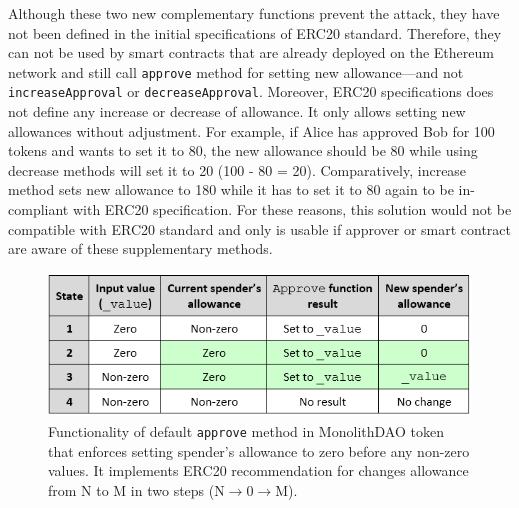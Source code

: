 \noindent Although these two new complementary functions prevent the attack, they have not been defined in the initial specifications of ERC20 standard. Therefore, they can not be used by smart contracts that are already deployed on the Ethereum network and still call \texttt{approve} method for setting new allowance---and not \texttt{increaseApproval} or \texttt{decreaseApproval}. Moreover, ERC20 specifications does not define any increase or decrease of allowance. It only allows setting new allowances without adjustment. For example, if Alice has approved Bob for 100 tokens and wants to set it to 80, the new allowance should be 80 while using decrease methods will set it to 20 (100 - 80 = 20). Comparatively, increase method sets new allowance to 180 while it has to set it to 80 again to be in-compliant with ERC20 specification. For these reasons, this solution would not be compatible with ERC20 standard and only is usable if approver or smart contract are aware of these supplementary methods.
\begin{figure}[t]
	\centering
	\includegraphics[width=1.0\linewidth]{figures/multiple_withdrawal_09.png}
	\caption{Functionality of default \texttt{approve} method in MonolithDAO token that enforces setting spender's allowance to zero before any non-zero values. It implements ERC20 recommendation for changes allowance from N to M in two steps (N$\rightarrow$0$\rightarrow$M).\label{fig:dao}}
\end{figure}


